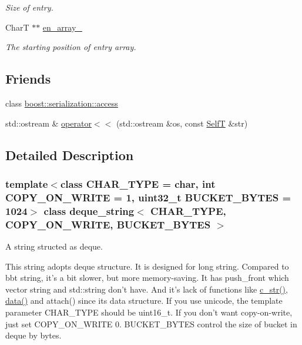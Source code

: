 \begin{CompactItemize}
\begin{CompactList}\small\item\em Size of entry. \item\end{CompactList}\item 
\hypertarget{classdeque__string_9f45c2d49d44d5c202d265f2245a121b}{
CharT $\ast$$\ast$ \hyperlink{classdeque__string_9f45c2d49d44d5c202d265f2245a121b}{en\_\-array\_\-}}
\label{classdeque__string_9f45c2d49d44d5c202d265f2245a121b}

\begin{CompactList}\small\item\em The starting position of entry array. \item\end{CompactList}\end{CompactItemize}
\subsection*{Friends}
\begin{CompactItemize}
\item 
class \hyperlink{classdeque__string_c98d07dd8f7b70e16ccb9a01abf56b9c}{boost::serialization::access}
\item 
std::ostream \& \hyperlink{classdeque__string_9f77d965eac7a717e9124196d686e094}{operator$<$$<$} (std::ostream \&os, const \hyperlink{classdeque__string}{SelfT} \&str)
\end{CompactItemize}


\subsection{Detailed Description}
\subsubsection*{template$<$class CHAR\_\-TYPE = char, int COPY\_\-ON\_\-WRITE = 1, uint32\_\-t BUCKET\_\-BYTES = 1024$>$ class deque\_\-string$<$ CHAR\_\-TYPE, COPY\_\-ON\_\-WRITE, BUCKET\_\-BYTES $>$}

A string structed as deque. 

This string adopts deque structure. It is designed for long string. Compared to bbt string, it's a bit slower, but more memory-saving. It has push\_\-front which vector string and std::string don't have. And it's lack of functions like \hyperlink{classdeque__string_45faac2747ddd177516bd5d41542cdd9}{c\_\-str()}, \hyperlink{classdeque__string_43d0a5c5653559cee6bd477fce3f0a2c}{data()} and attach() since its data structure. If you use unicode, the template parameter CHAR\_\-TYPE should be uint16\_\-t. If you don't want copy-on-write, just set COPY\_\-ON\_\-WRITE 0. BUCKET\_\-BYTES control the size of bucket in deque by bytes. 


